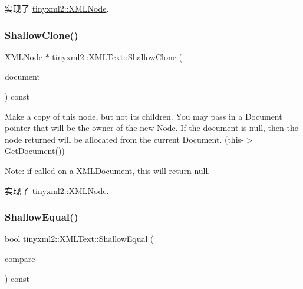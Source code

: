 实现了 \hyperlink{classtinyxml2_1_1_x_m_l_node_a81e66df0a44c67a7af17f3b77a152785}{tinyxml2\+::\+X\+M\+L\+Node}.

\mbox{\label{classtinyxml2_1_1_x_m_l_text_a86d265c93152726c8c6831e9594840e6}} 
\subsubsection{\texorpdfstring{Shallow\+Clone()}{ShallowClone()}}
{\footnotesize\ttfamily \hyperlink{classtinyxml2_1_1_x_m_l_node}{X\+M\+L\+Node} $\ast$ tinyxml2\+::\+X\+M\+L\+Text\+::\+Shallow\+Clone (\begin{DoxyParamCaption}\item[{\hyperlink{classtinyxml2_1_1_x_m_l_document}{X\+M\+L\+Document} $\ast$}]{document }\end{DoxyParamCaption}) const\hspace{0.3cm}{\ttfamily [virtual]}}

Make a copy of this node, but not its children. You may pass in a Document pointer that will be the owner of the new Node. If the \textquotesingle{}document\textquotesingle{} is null, then the node returned will be allocated from the current Document. (this-\/$>$\hyperlink{classtinyxml2_1_1_x_m_l_node_af343d1ef0b45c0020e62d784d7e67a68}{Get\+Document()})

Note\+: if called on a \hyperlink{classtinyxml2_1_1_x_m_l_document}{X\+M\+L\+Document}, this will return null. 

实现了 \hyperlink{classtinyxml2_1_1_x_m_l_node_a8402cbd3129d20e9e6024bbcc0531283}{tinyxml2\+::\+X\+M\+L\+Node}.

\mbox{\label{classtinyxml2_1_1_x_m_l_text_a99d8bce4dc01df889126e047f358cdfc}} 
\subsubsection{\texorpdfstring{Shallow\+Equal()}{ShallowEqual()}}
{\footnotesize\ttfamily bool tinyxml2\+::\+X\+M\+L\+Text\+::\+Shallow\+Equal (\begin{DoxyParamCaption}\item[{const \hyperlink{classtinyxml2_1_1_x_m_l_node}{X\+M\+L\+Node} $\ast$}]{compare }\end{DoxyParamCaption}) const\hspace{0.3cm}{\ttfamily [virtual]}}

